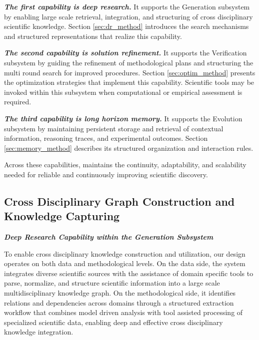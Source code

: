 \textbf{\textit{The first capability is deep research.}} It supports the Generation subsystem by enabling large scale retrieval, integration, and structuring of cross disciplinary scientific knowledge. Section \ref{sec:dr_method} introduces the search mechanisms and structured representations that realize this capability.

\textbf{\textit{The second capability is solution refinement.}} It supports the Verification subsystem by guiding the refinement of methodological plans and structuring the multi round search for improved procedures. Section \ref{sec:optim_method} presents the optimization strategies that implement this capability. Scientific tools may be invoked within this subsystem when computational or empirical assessment is required.

\textbf{\textit{The third capability is long horizon memory.}} It supports the Evolution subsystem by maintaining persistent storage and retrieval of contextual information, reasoning traces, and experimental outcomes. Section \ref{sec:memory_method} describes its structured organization and interaction rules.

Across these capabilities, {\ProjectName} maintains the continuity, adaptability, and scalability needed for reliable and continuously improving scientific discovery.


\subsection{Cross Disciplinary Graph Construction and Knowledge Capturing}
\vspace{-0.5em}
{\raggedleft \normalsize \color{gray} \textbf{\textit{Deep Research Capability within the Generation Subsystem}}\par}


\label{sec:dr_method}
To enable cross disciplinary knowledge construction and utilization, our design operates on both data and methodological levels. On the data side, the system integrates diverse scientific sources with the assistance of domain specific tools to parse, normalize, and structure scientific information into a large scale multidisciplinary knowledge graph. On the methodological side, it identifies relations and dependencies across domains through a structured extraction workflow that combines model driven analysis with tool assisted processing of specialized scientific data, enabling deep and effective cross disciplinary knowledge integration.

